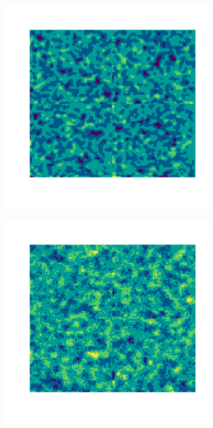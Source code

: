 \documentclass[10pt]{article} %
\begin{document}
\begin{figure}[h!]
    \centering
    \begin{subfigure}[b]{0.3\textwidth}
        \centering
        \includegraphics[width=\textwidth]{media/gauss_2.7_1_1.png}
        \label{gauss plasma}
    \end{subfigure}
    \hfill
    \begin{subfigure}[b]{0.3\textwidth}
        \centering
        \includegraphics[width=\textwidth]{media/sphere.png}

\end{subfigure}
\end{figure}
\end{document}
